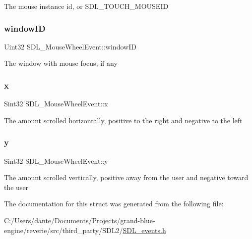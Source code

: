The mouse instance id, or S\+D\+L\+\_\+\+T\+O\+U\+C\+H\+\_\+\+M\+O\+U\+S\+E\+ID \mbox{\label{struct_s_d_l___mouse_wheel_event_ab45eb1895217214ecb773fc555e08f6c}} 
\subsubsection{\texorpdfstring{windowID}{windowID}}
{\footnotesize\ttfamily Uint32 S\+D\+L\+\_\+\+Mouse\+Wheel\+Event\+::window\+ID}

The window with mouse focus, if any \mbox{\label{struct_s_d_l___mouse_wheel_event_a6d904eef474ea45a5b1828fcb5b0f859}} 
\subsubsection{\texorpdfstring{x}{x}}
{\footnotesize\ttfamily Sint32 S\+D\+L\+\_\+\+Mouse\+Wheel\+Event\+::x}

The amount scrolled horizontally, positive to the right and negative to the left \mbox{\label{struct_s_d_l___mouse_wheel_event_a53fdf77a464426bc8b30e629795f044b}} 
\subsubsection{\texorpdfstring{y}{y}}
{\footnotesize\ttfamily Sint32 S\+D\+L\+\_\+\+Mouse\+Wheel\+Event\+::y}

The amount scrolled vertically, positive away from the user and negative toward the user 

The documentation for this struct was generated from the following file\+:\begin{DoxyCompactItemize}
\item 
C\+:/\+Users/dante/\+Documents/\+Projects/grand-\/blue-\/engine/reverie/src/third\+\_\+party/\+S\+D\+L2/\mbox{\hyperlink{_s_d_l__events_8h}{S\+D\+L\+\_\+events.\+h}}\end{DoxyCompactItemize}
